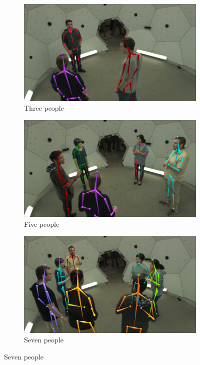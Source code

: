 \begin{figure}[t]
\begin{subfigure}{0.245\textwidth}
			\includegraphics[width=\textwidth]{figures/0807_quant_noLegend/three}
	\caption{Three people}		
		\end{subfigure}
		\begin{subfigure}{0.245\textwidth}
			
			\includegraphics[width=\textwidth]{figures/0807_quant_noLegend/five}
	\caption{Five people}		
		\end{subfigure}
		\begin{subfigure}{0.245\textwidth}
			
			\includegraphics[width=\textwidth]{figures/0807_quant_noLegend/seven}
		\caption{Seven people}		
		\end{subfigure}
		


\end{figure}
